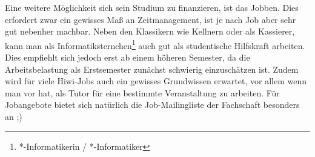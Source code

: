Eine weitere Möglichkeit sich sein Studium zu finanzieren, ist das Jobben. Dies erfordert zwar ein gewisses Maß an Zeitmanagement, ist je nach Job aber sehr gut nebenher machbar. Neben den Klassikern wie Kellnern oder als Kassierer, kann man als Informatik\-stern\-chen\footnote{*-Informatikerin / *-Informatiker} auch gut als studentische Hilfskraft arbeiten. Dies empfiehlt sich jedoch erst ab einem höheren Semester, da die Arbeitsbelastung als Erstsemester zunächst schwierig einzuschätzen ist. Zudem wird für viele Hiwi-Jobs auch ein gewisses Grundwissen erwartet, vor allem wenn man vor hat, als Tutor für eine bestimmte Veranstaltung zu arbeiten. Für Jobangebote bietet sich natürlich die Job-Mailingliste der Fachschaft besonders an ;)